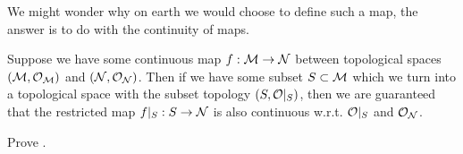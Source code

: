 We might wonder why on earth we would choose to define such a map, the answer is to do with the continuity of maps. 

\bcl 
\label{claim:RestrictedMapContinuous}
    Suppose we have some continuous map $f:\mathcal{M}\to \mathcal{N}$ between topological spaces $(\mathcal{M},\mathcal{O}_{\mathcal{M}})$ and $(\mathcal{N},\mathcal{O}_{\mathcal{N}})$. Then if we have some subset $S\subset \mathcal{M}$ which we turn into a topological space with the subset topology $(S,\mathcal{O}|_S)$, then we are guaranteed that the restricted map $f|_S : S\to \mathcal{N}$ is also continuous w.r.t. $\mathcal{O}|_S$ and $\mathcal{O}_{\mathcal{N}}$. 
\ecl 

\bbox 
    Prove .
\ebox 